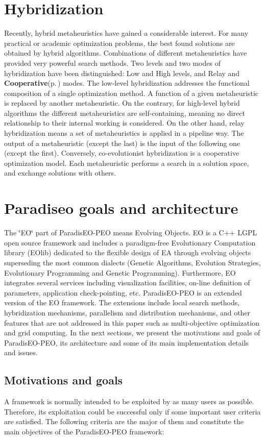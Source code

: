 \section{Hybridization}\label{main_hybridization}
Recently, hybrid metaheuristics have gained a considerable interest. For many practical or academic optimization problems, the best found solutions are obtained by hybrid algorithms. Combinations of different metaheuristics have provided very powerful search methods. Two levels and two modes of hybridization have been distinguished: Low and High levels, and Relay and {\bf Cooperative}{\rm (p.\,\pageref{class_cooperative})} modes. The low-level hybridization addresses the functional composition of a single optimization method. A function of a given metaheuristic is replaced by another metaheuristic. On the contrary, for high-level hybrid algorithms the different metaheuristics are self-containing, meaning no direct relationship to their internal working is considered. On the other hand, relay hybridization means a set of metaheuristics is applied in a pipeline way. The output of a metaheuristic (except the last) is the input of the following one (except the first). Conversely, co-evolutionist hybridization is a cooperative optimization model. Each metaheuristic performs a search in a solution space, and exchange solutions with others.\section{Paradiseo goals and architecture}\label{main_paradiseo_goals}
The \char`\"{}EO\char`\"{} part of Paradis\-EO-PEO means Evolving Objects. EO is a C++ LGPL open source framework and includes a paradigm-free Evolutionary Computation library (EOlib) dedicated to the flexible design of EA through evolving objects superseding the most common dialects (Genetic Algorithms, Evolution Strategies, Evolutionary Programming and Genetic Programming). Furthermore, EO integrates several services including visualization facilities, on-line definition of parameters, application check-pointing, etc. Paradis\-EO-PEO is an extended version of the EO framework. The extensions include local search methods, hybridization mechanisms, parallelism and distribution mechanisms, and other features that are not addressed in this paper such as multi-objective optimization and grid computing. In the next sections, we present the motivations and goals of Paradis\-EO-PEO, its architecture and some of its main implementation details and issues.\subsection{Motivations and goals}\label{main_motivation}
A framework is normally intended to be exploited by as many users as possible. Therefore, its exploitation could be successful only if some important user criteria are satisfied. The following criteria are the major of them and constitute the main objectives of the Paradis\-EO-PEO framework:

